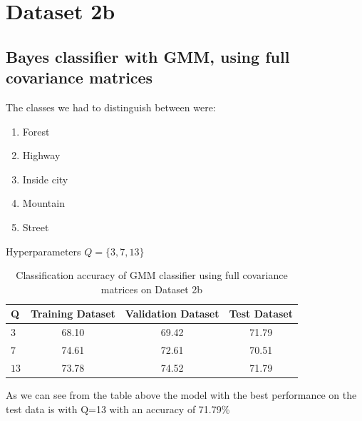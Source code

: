 \documentclass[11pt]{article}
\begin{document}
\section{Dataset 2b}
\subsection{Bayes classifier with GMM, using full covariance matrices}

The classes we had to distinguish between were:
\begin{enumerate}
\item Forest
\item Highway
\item Inside city
\item Mountain
\item Street
\end{enumerate}

Hyperparameters $Q = \{3,7,13\}$
\begin{table}[h!]
\label{tab:tab1.1.1}
\begin{center}
\begin{tabular}{|l|c|c|c|}
\hline
\textbf{Q } & \textbf{Training Dataset} & \textbf{Validation Dataset} &\textbf{Test Dataset}\\
\hline
$3$ & 68.10 & 69.42 & 71.79\\
\hline
$7$ & 74.61 & 72.61 & 70.51\\
\hline
$13$ & 73.78 & 74.52 & 71.79\\
\hline
\end{tabular}
\caption{Classification accuracy of GMM classifier using full covariance matrices on Dataset 2b}
\end{center}
\end{table}

As we can see from the table above the model with the best performance on the test data is with  Q=13 with an accuracy of 71.79\% 
\end{document}

